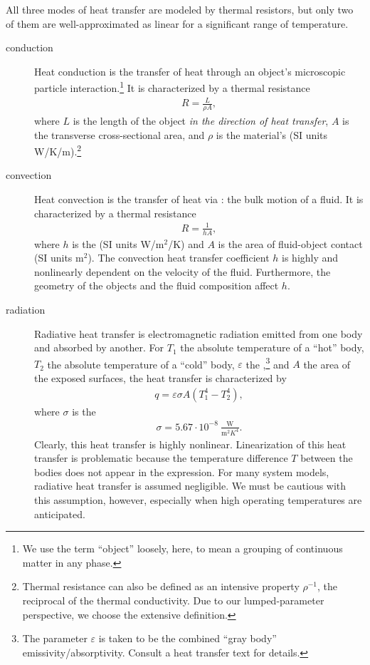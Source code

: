 \documentclass[dynamic_systems.tex]{subfiles}
\begin{document}
All three modes of heat transfer are modeled by thermal resistors, but only two of them are well-approximated as linear for a significant range of temperature.
\begin{description}
	\item[conduction] Heat conduction is the transfer of heat through an object's microscopic particle interaction.\footnote{We use the term ``object'' loosely, here, to mean a grouping of continuous matter in any phase.}
	It is characterized by a thermal resistance
	\begin{align}
		R = \frac{L}{\rho A},
	\end{align}
	where $L$ is the length of the object \emph{in the direction of heat transfer}, $A$ is the transverse cross-sectional area, and $\rho$ is the material's  (SI units W/K/m).\footnote{Thermal resistance can also be defined as an intensive property $\rho^{-1}$, the reciprocal of the thermal conductivity. Due to our lumped-parameter perspective, we choose the extensive definition.}
	\item[convection] Heat convection is the transfer of heat via : the bulk motion of a fluid.
	It is characterized by a thermal resistance
	\begin{align}
		R = \frac{1}{h A},
	\end{align}
	where $h$ is the  (SI units W/m$^2$/K) and $A$ is the area of fluid-object contact (SI units m$^2$).
	The convection heat transfer coefficient $h$ is highly and nonlinearly dependent on the velocity of the fluid.
	Furthermore, the geometry of the objects and the fluid composition affect $h$.
	\item[radiation] Radiative heat transfer is electromagnetic radiation emitted from one body and absorbed by another. For $T_1$ the absolute temperature of a ``hot'' body, $T_2$ the absolute temperature of a ``cold'' body, $\varepsilon$ the ,\footnote{The parameter $\varepsilon$ is taken to be the combined ``gray body'' emissivity/absorptivity. Consult a heat transfer text for details.} and $A$ the area of the exposed surfaces, the heat transfer is characterized by
	\begin{align}
		q = \varepsilon \sigma A (T_1^4 - T_2^4),
	\end{align}
	where $\sigma$ is the 
	\begin{align}
		\sigma = 5.67 \cdot 10^{-8}\ \frac{\textrm{W}}{\textrm{m}^2 K^4}.
	\end{align}
	Clearly, this heat transfer is highly nonlinear.
	Linearization of this heat transfer is problematic because the temperature difference $T$ between the bodies does not appear in the expression.
	For many system models, radiative heat transfer is assumed negligible.
	We must be cautious with this assumption, however, especially when high operating temperatures are anticipated.
\end{description}
\end{document}
